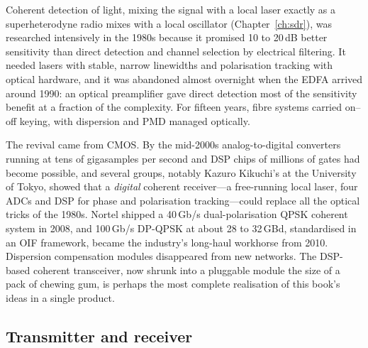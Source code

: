 \begin{history}
Coherent detection of light, mixing the signal with a local laser exactly as a superheterodyne radio
mixes with a local oscillator (Chapter~\ref{ch:sdr}), was researched intensively in the 1980s because it
promised 10 to 20\,dB better sensitivity than direct detection and channel selection by electrical
filtering. It needed lasers with stable, narrow linewidths and polarisation tracking with optical
hardware, and it was abandoned almost overnight when the EDFA arrived around 1990: an optical
preamplifier gave direct detection most of the sensitivity benefit at a fraction of the complexity.
For fifteen years, fibre systems carried on--off keying, with dispersion and PMD managed optically.

The revival came from CMOS. By the mid-2000s analog-to-digital converters running at tens of gigasamples
per second and DSP chips of millions of gates had become possible, and several groups, notably Kazuro
Kikuchi's at the University of Tokyo, showed that a \emph{digital} coherent receiver---a free-running local
laser, four ADCs and DSP for phase and polarisation tracking---could replace all the optical tricks of
the 1980s. Nortel shipped a 40\,Gb/s dual-polarisation QPSK coherent system in 2008, and 100\,Gb/s
DP-QPSK at about 28 to 32\,GBd, standardised in an OIF framework, became the industry's long-haul
workhorse from 2010. Dispersion compensation modules disappeared from new networks. The DSP-based
coherent transceiver, now shrunk into a pluggable module the size of a pack of chewing gum, is perhaps
the most complete realisation of this book's ideas in a single product.
\end{history}

\subsection{Transmitter and receiver}


